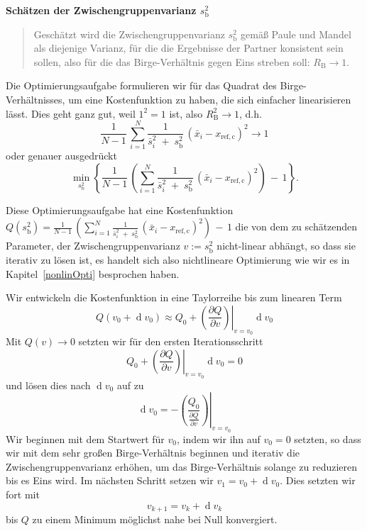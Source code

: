 \textbf{Schätzen der Zwischengruppenvarianz $s^2_\mathrm{b}$}
\begin{quote}
Geschätzt wird die Zwischengruppenvarianz $s^2_\mathrm{b}$ gemäß Paule und Mandel \cite{Pau82} als
diejenige Varianz, für die die Ergebnisse der Partner konsistent sein sollen, also für die
das Birge-Verhältnis gegen Eins streben soll: $R_\mathrm{B} \rightarrow 1$.
\end{quote}
Die Optimierungsaufgabe formulieren wir für das Quadrat des Birge-Verhältnisses,
um eine Kostenfunktion zu haben, die sich einfacher linearisieren lässt. Dies
geht ganz gut, weil $1^2 = 1$ ist, also $R^2_\mathrm{B} \rightarrow 1$, d.h.
\begin{equation*}
\frac{1}{N-1} \, \sum\limits_{i=1}^N
\frac{1}{\bar s^2_i \; + \; s^2_\mathrm{b}} \, \left(\bar x_i - x_\mathrm{ref, c}\right)^2 \rightarrow 1
\end{equation*}
oder genauer ausgedrückt
\begin{equation}
\min_{s^2_\mathrm{b}} \left\{\frac{1}{N-1} \, \left( \sum\limits_{i=1}^N
\frac{1}{\bar s^2_i \; + \; s^2_\mathrm{b}} \, \left(\bar x_i - x_\mathrm{ref, c}\right)^2  \right) \, - \, 1\right\}.
\label{eq:x_bet_Bedingung}
\end{equation}

Diese Optimierungsaufgabe hat eine Kostenfunktion 
$Q(s^2_\mathrm{b}) = \frac{1}{N-1} \, \left( \sum\limits_{i=1}^N 
\frac{1}{\bar s^2_i \; + \; s^2_\mathrm{b}} \, \left(\bar x_i - x_\mathrm{ref, c}\right)^2  \right) \, - \, 1$
die von dem zu schätzenden Parameter, der Zwischengruppenvarianz
$v := s^2_\mathrm{b}$ nicht-linear abhängt, so dass sie iterativ zu lösen ist, es handelt sich also
nichtlineare Optimierung wie wir es in Kapitel~\ref{nonlinOpti} besprochen haben.

Wir entwickeln die Kostenfunktion in 
eine Taylorreihe bis zum linearen Term
\begin{equation}
Q(v_0 + \operatorname{d} v_0) \approx 
Q_0 + \left.\left( \frac{\partial Q}{\partial v}\right)
\right|_{v=v_0} \operatorname{d} v_0 
\end{equation}
Mit $Q(v) \rightarrow 0$ setzten wir für den ersten
Iterationsschritt
\begin{equation}
Q_0 + \left.\left( \frac{\partial Q}{\partial v}\right)
\right|_{v=v_0} \operatorname{d} v_0 = 0
\end{equation}
und lösen dies nach $\operatorname{d} v_0$ auf zu
\begin{equation}
\operatorname{d} v_0 = -\left. \left( \frac{Q_0}{\frac{\partial Q}{\partial v}}\right) \right| _{v=v_0} 
\end{equation}
Wir beginnen mit dem Startwert für $v_0$, indem wir ihn auf $v_0 = 0$ setzten, so dass wir
mit dem sehr großen Birge-Verhältnis beginnen und iterativ die Zwischengruppenvarianz
erhöhen, um das Birge-Verhältnis solange zu reduzieren bis es Eins wird.
Im nächsten Schritt setzen wir $v_1 = v_0 + \operatorname{d} v_0$.
Dies setzten wir fort mit
\begin{equation}
v_{k+1} =v_k + \operatorname{d} v_k
\end{equation}
bis $Q$ zu einem Minimum möglichst nahe bei Null konvergiert.

